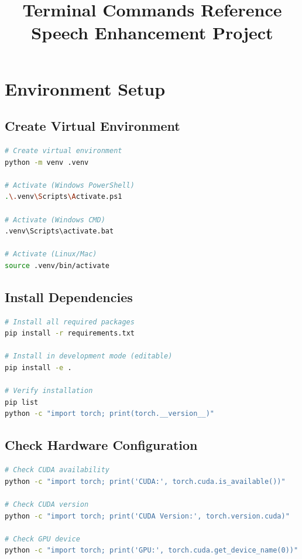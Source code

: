 \documentclass[12pt,a4paper]{article}
\title{Terminal Commands Reference\\Speech Enhancement Project}
\author{}
\date{}
\begin{document}
\maketitle
\tableofcontents
\newpage

\section{Environment Setup}

\subsection{Create Virtual Environment}

\begin{lstlisting}[language=bash]
# Create virtual environment
python -m venv .venv

# Activate (Windows PowerShell)
.\.venv\Scripts\Activate.ps1

# Activate (Windows CMD)
.venv\Scripts\activate.bat

# Activate (Linux/Mac)
source .venv/bin/activate
\end{lstlisting}

\subsection{Install Dependencies}

\begin{lstlisting}[language=bash]
# Install all required packages
pip install -r requirements.txt

# Install in development mode (editable)
pip install -e .

# Verify installation
pip list
python -c "import torch; print(torch.__version__)"
\end{lstlisting}

\subsection{Check Hardware Configuration}

\begin{lstlisting}[language=bash]
# Check CUDA availability
python -c "import torch; print('CUDA:', torch.cuda.is_available())"

# Check CUDA version
python -c "import torch; print('CUDA Version:', torch.version.cuda)"

# Check GPU device
python -c "import torch; print('GPU:', torch.cuda.get_device_name(0))"
\end{lstlisting}
\end{document}
